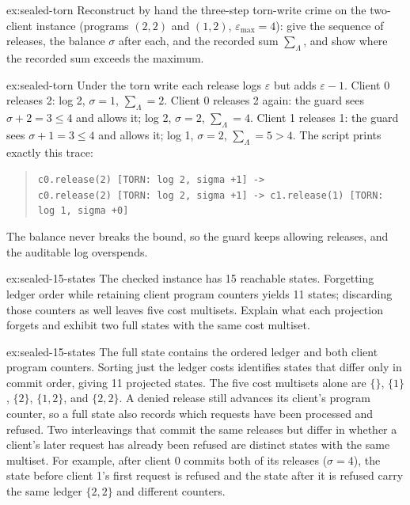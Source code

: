 \documentclass[11pt,a4paper]{article}
\theoremstyle{definition}
\begin{document}

\begin{pdexercise}[kind=Trace,rating=2]{ex:sealed-torn}
Reconstruct by hand the three-step torn-write crime on the two-client instance
(programs $(2,2)$ and $(1,2)$, $\varepsilon_{\max}=4$): give the sequence of
releases, the balance $\sigma$ after each, and the recorded sum
$\sum_\Lambda$, and show where the recorded sum exceeds the maximum.
\end{pdexercise}
\begin{pdsolution}{ex:sealed-torn}
Under the torn write each release logs $\varepsilon$ but adds $\varepsilon-1$.
Client 0 releases 2: log 2, $\sigma=1$, $\sum_\Lambda=2$. Client 0 releases 2
again: the guard sees $\sigma+2=3\le4$ and allows it; log 2, $\sigma=2$,
$\sum_\Lambda=4$. Client 1 releases 1: the guard sees $\sigma+1=3\le4$ and
allows it; log 1, $\sigma=2$, $\sum_\Lambda=5>4$. The script prints exactly
this trace:
\begin{quote}\footnotesize\texttt{c0.release(2) [TORN: log 2, sigma +1] ->}\\
\texttt{c0.release(2) [TORN: log 2, sigma +1] -> c1.release(1) [TORN: log 1, sigma +0]}
\end{quote}
The balance never breaks the bound, so the guard keeps allowing releases, and the
auditable log overspends.
\end{pdsolution}

\begin{pdexercise}[kind=Trace,rating=2]{ex:sealed-15-states}
The checked instance has 15 reachable states. Forgetting ledger order while
retaining client program counters yields 11 states; discarding those counters
as well leaves five cost multisets. Explain what each projection forgets and
exhibit two full states with the same cost multiset.
\end{pdexercise}
\begin{pdsolution}{ex:sealed-15-states}
The full state contains the ordered ledger and both client program counters.
Sorting just the ledger costs identifies states that differ only in commit
order, giving 11 projected states. The five cost multisets alone are
$\{\}$, $\{1\}$, $\{2\}$, $\{1,2\}$, and $\{2,2\}$.
A denied release still advances its client's program counter, so a full state
also records which requests have been processed and refused. Two interleavings that commit the same releases but differ in whether
a client's later request has already been refused are distinct states with the
same multiset. For example, after client 0 commits both of its releases
($\sigma=4$), the state before client 1's first request is refused and the
state after it is refused carry the same ledger $\{2,2\}$ and different
counters.
\end{pdsolution}
\end{document}
